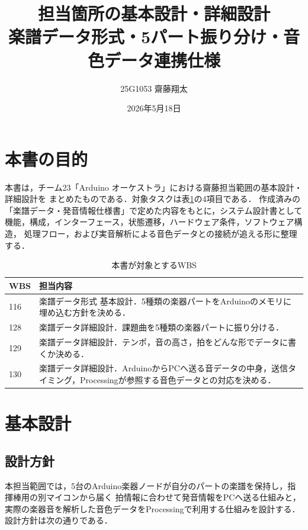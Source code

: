 \documentclass[uplatex,dvipdfmx]{jlreq}
\begin{document}
\title{担当箇所の基本設計・詳細設計\\
{\large 楽譜データ形式・5パート振り分け・音色データ連携仕様}}
\author{25G1053 齋藤翔太}
\date{2026年5月18日}
\maketitle

\section*{本書の目的}

本書は，チーム23「Arduino オーケストラ」における齋藤担当範囲の基本設計・詳細設計を
まとめたものである．対象タスクは表\ref{tab:saito-wbs-scope}の4項目である．
作成済みの「楽譜データ・発音情報仕様書」で定めた内容をもとに，システム設計書として
機能，構成，インターフェース，状態遷移，ハードウェア条件，ソフトウェア構造，
処理フロー，および実音解析による音色データとの接続が追える形に整理する．

\begin{table}[H]
\centering
\caption{本書が対象とするWBS}
\label{tab:saito-wbs-scope}
\begin{tabular}{p{}p{}}
\toprule
\textbf{WBS} & \textbf{担当内容} \\
\midrule
116 & 楽譜データ形式 基本設計．5種類の楽器パートをArduinoのメモリに埋め込む方針を決める．\\
128 & 楽譜データ詳細設計．課題曲を5種類の楽器パートに振り分ける．\\
129 & 楽譜データ詳細設計．テンポ，音の高さ，拍をどんな形でデータに書くか決める．\\
130 & 楽譜データ詳細設計．ArduinoからPCへ送る音データの中身，送信タイミング，Processingが参照する音色データとの対応を決める．\\
\bottomrule
\end{tabular}
\end{table}

\section{基本設計}

\subsection{設計方針}

本担当範囲では，5台のArduino楽器ノードが自分のパートの楽譜を保持し，指揮棒用の別マイコンから届く
拍情報に合わせて発音情報をPCへ送る仕組みと，実際の楽器音を解析した音色データをProcessingで利用する仕組みを設計する．
設計方針は次の通りである．
\end{document}

